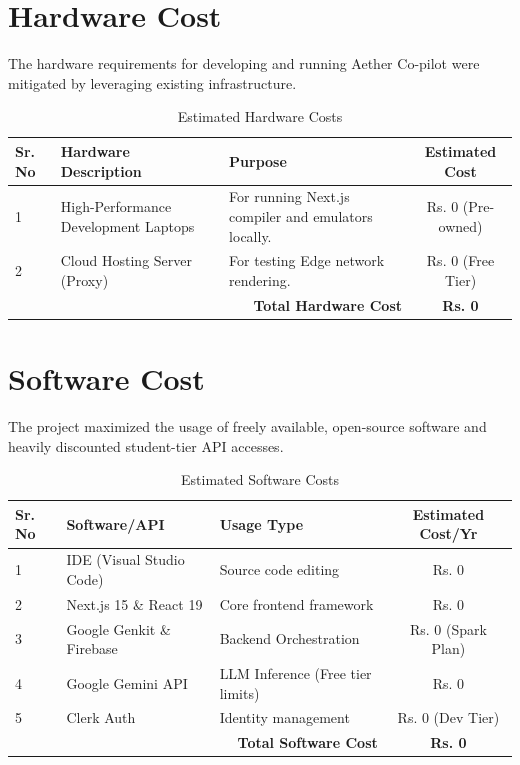\section{Hardware Cost}
The hardware requirements for developing and running Aether Co-pilot were mitigated by leveraging existing infrastructure.
\begin{table}[h!]
\centering
\begin{tabular}{|l|p{6cm}|p{3cm}|c|}
\hline
\textbf{Sr. No} & \textbf{Hardware Description} & \textbf{Purpose} & \textbf{Estimated Cost} \\ \hline
1 & High-Performance Development Laptops & For running Next.js compiler and emulators locally. & Rs. 0 (Pre-owned) \\ \hline
2 & Cloud Hosting Server (Proxy) & For testing Edge network rendering. & Rs. 0 (Free Tier) \\ \hline
\multicolumn{3}{|r|}{\textbf{Total Hardware Cost}} & \textbf{Rs. 0} \\ \hline
\end{tabular}
\caption{Estimated Hardware Costs}
\end{table}

\section{Software Cost}
The project maximized the usage of freely available, open-source software and heavily discounted student-tier API accesses.
\begin{table}[h!]
\centering
\begin{tabular}{|l|p{4cm}|p{5cm}|c|}
\hline
\textbf{Sr. No} & \textbf{Software/API} & \textbf{Usage Type} & \textbf{Estimated Cost/Yr} \\ \hline
1 & IDE (Visual Studio Code) & Source code editing & Rs. 0 \\ \hline
2 & Next.js 15 \& React 19 & Core frontend framework & Rs. 0 \\ \hline
3 & Google Genkit \& Firebase & Backend Orchestration & Rs. 0 (Spark Plan) \\ \hline
4 & Google Gemini API & LLM Inference (Free tier limits) & Rs. 0 \\ \hline
5 & Clerk Auth & Identity management & Rs. 0 (Dev Tier) \\ \hline
\multicolumn{3}{|r|}{\textbf{Total Software Cost}} & \textbf{Rs. 0} \\ \hline
\end{tabular}
\caption{Estimated Software Costs}
\end{table}

